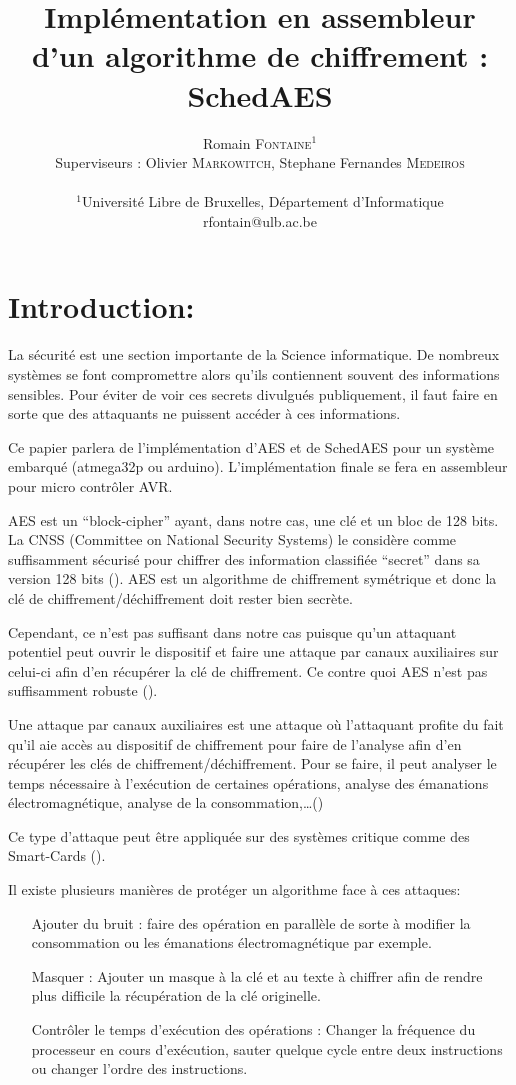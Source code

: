 \documentclass[letterpaper]{article}
\author{Romain \textsc{Fontaine}$^{1}$\\
    Superviseurs : Olivier \textsc{Markowitch}, Stephane Fernandes \textsc{Medeiros}\\
    \mbox{}\\
    $^1$Université Libre de Bruxelles, Département d’Informatique \\
    rfontain@ulb.ac.be
}
\title{Implémentation en assembleur d'un algorithme de chiffrement :\\ SchedAES}
\date{}
\begin{document}
\maketitle

\section{Introduction:}
La sécurité est une section importante de la Science informatique. De nombreux systèmes se font compromettre alors qu'ils contiennent souvent des informations sensibles. Pour éviter de voir ces secrets divulgués publiquement, il faut faire en sorte que des attaquants ne puissent accéder à ces informations.

Ce papier parlera de l'implémentation d'AES et de SchedAES pour un système embarqué (atmega32p ou arduino). L'implémentation finale se fera en assembleur pour micro contrôler AVR.

AES est un ``block-cipher'' ayant, dans notre cas, une clé et un bloc de 128 bits.
La CNSS (Committee on National Security Systems) le considère comme suffisamment sécurisé pour chiffrer des information classifiée ``secret'' dans sa version 128 bits (\cite{policy2003no}).
AES est un algorithme de chiffrement symétrique et donc la clé de chiffrement/déchiffrement doit rester bien secrète.

Cependant, ce n'est pas suffisant dans notre cas puisque qu'un attaquant potentiel peut ouvrir le dispositif et faire une attaque par canaux auxiliaires sur celui-ci afin d'en récupérer la clé de chiffrement. Ce contre quoi AES n'est pas suffisamment robuste (\cite{Renauld2009}).

Une attaque par canaux auxiliaires est une attaque où l'attaquant profite du fait qu'il aie accès au dispositif de chiffrement pour faire de l'analyse afin d'en récupérer les clés de chiffrement/déchiffrement.
Pour se faire, il peut analyser le temps nécessaire à l'exécution de certaines opérations, analyse des émanations électromagnétique, analyse de la consommation,\ldots(\cite{zhou2005side})

Ce type d'attaque peut être appliquée sur des systèmes critique comme des Smart-Cards (\cite{chari1999cautionary}).

Il existe plusieurs manières de protéger un algorithme face à ces attaques:
\begin{itemize}
    \item[Ajouter du bruit :] faire des opération en parallèle de sorte à modifier la consommation ou les émanations électromagnétique par exemple.
    \item[Masquer :] Ajouter un masque à la clé et au texte à chiffrer afin de rendre plus difficile la récupération de la clé originelle.
    \item[Contrôler le temps d'exécution des opérations :] Changer la fréquence du processeur en cours d'exécution, sauter quelque cycle entre deux instructions ou changer l'ordre des instructions.
\end{itemize}
\end{document}
